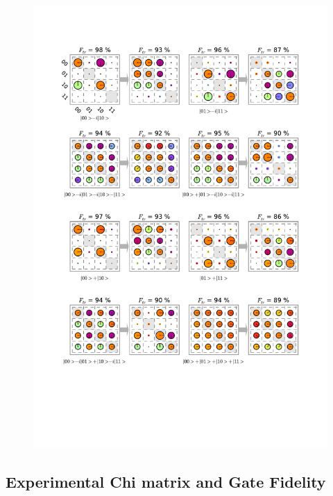 \begin{figure}[p]
	\centering
		\includegraphics[width=1\textwidth]{"./data/ct5/2011_04_21 - grover and tomo/good_data/process -matrices 2"}
	\caption{}
	\label{fig:process_matrices_2}
\end{figure}

\subsection{Experimental Chi matrix and Gate Fidelity}

